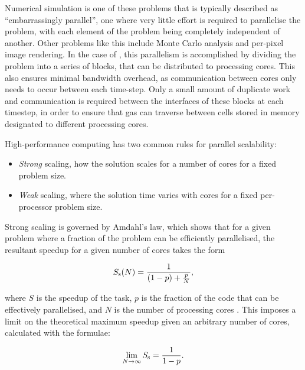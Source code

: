 Numerical simulation is one of these problems that is typically described as ``embarrassingly parallel'', one where very little effort is required to parallelise the problem, with each element of the problem being completely independent of another.
Other problems like this include Monte Carlo analysis and per-pixel image rendering.
In the case of \athena{}, this parallelism is accomplished by dividing the problem into a series of blocks, that can be distributed to processing cores.
This also ensures minimal bandwidth overhead, as communication between cores only needs to occur between each time-step.
Only a small amount of duplicate work and communication is required between the interfaces of these blocks at each timestep, in order to ensure that gas can traverse between cells stored in memory designated to different processing cores.

High-performance computing has two common rules for parallel scalability:

\begin{itemize}
  \item \emph{Strong} scaling, how the solution scales for a number of cores for a fixed problem size. 
  \item \emph{Weak} scaling, where the solution time varies with cores for a fixed per-processor problem size.
\end{itemize}

\noindent
Strong scaling is governed by Amdahl's law, which shows that for a given problem where a fraction of the problem can be efficiently parallelised, the resultant speedup for a given number of cores takes the form

\begin{equation}
  S_\text{s}(N) = \frac{1}{(1-p) + \frac{p}{N}},
\end{equation}

\noindent
where $S$ is the speedup of the task, $p$ is the fraction of the code that can be effectively parallelised, and $N$ is the number of processing cores \parencite{amdahlValiditySingleProcessor1967}.
This imposes a limit on the theoretical maximum speedup given an arbitrary number of cores, calculated with the formulae:

\begin{equation}
  \lim_{N \rightarrow \infty} S_\text{s} = \frac{1}{1-p} .
\end{equation}

